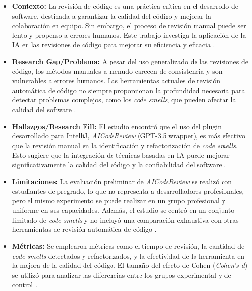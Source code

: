 \documentclass{article}
\begin{document}
\begin{itemize}
    \item \textbf{Contexto:} La revisión de código es una práctica crítica en el desarrollo de software, destinada a garantizar la calidad del código y mejorar la colaboración en equipo. Sin embargo, el proceso de revisión manual puede ser lento y propenso a errores humanos. Este trabajo investiga la aplicación de la IA en las revisiones de código para mejorar su eficiencia y eficacia \cite{ALMEIDA2024101677}.
    
    \item \textbf{Research Gap/Problema:} A pesar del uso generalizado de las revisiones de código, los métodos manuales a menudo carecen de consistencia y son vulnerables a errores humanos. Las herramientas actuales de revisión automática de código no siempre proporcionan la profundidad necesaria para detectar problemas complejos, como los \textit{code smells}, que pueden afectar la calidad del software \cite{ALMEIDA2024101677}.
    
    \item \textbf{Hallazgos/Research Fill:} El estudio encontró que el uso del plugin desarrollado para IntelliJ, \textit{AICodeReview} (GPT-3.5 wrapper), es más efectivo que la revisión manual en la identificación y refactorización de \textit{code smells}. Esto sugiere que la integración de técnicas basadas en IA puede mejorar significativamente la calidad del código y la confiabilidad del software \cite{ALMEIDA2024101677}.
    
    \item \textbf{Limitaciones:} La evaluación preliminar de \textit{AICodeReview} se realizó con estudiantes de pregrado, lo que no representa a desarrolladores profesionales, pero el mismo experimento se puede realizar en un grupo profesional y uniforme en sus capacidades. Además, el estudio se centró en un conjunto limitado de \textit{code smells} y no incluyó una comparación exhaustiva con otras herramientas de revisión automática de código \cite{ALMEIDA2024101677}.
    
    
    \item \textbf{Métricas:} Se emplearon métricas como el tiempo de revisión, la cantidad de \textit{code smells} detectados y refactorizados, y la efectividad de la herramienta en la mejora de la calidad del código. El tamaño del efecto de Cohen (\textit{Cohen's d}) se utilizó para analizar las diferencias entre los grupos experimental y de control \cite{ALMEIDA2024101677}.
\end{itemize}
\end{document}
